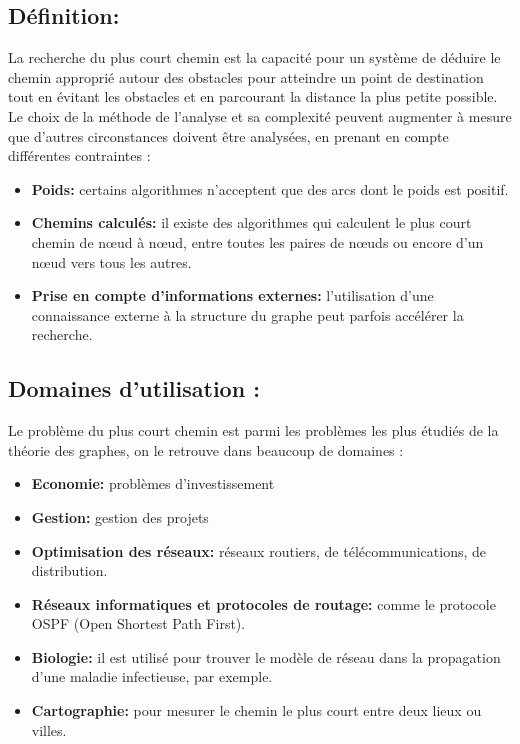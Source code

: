 \subsection{Définition:}
La recherche du plus court chemin est la capacité pour un système de déduire le chemin approprié autour des obstacles pour atteindre un point de destination tout en évitant les obstacles et en parcourant la distance la plus petite possible.
Le choix de la méthode de l'analyse et sa complexité peuvent augmenter à mesure que d'autres circonstances doivent être analysées, en prenant en compte différentes contraintes :

\begin{itemize}
	\item \textbf{Poids:} certains algorithmes n'acceptent que des arcs dont le poids est positif.
	\item \textbf{Chemins calculés:} il existe des algorithmes qui calculent le plus court chemin de nœud à nœud, entre toutes les paires de nœuds ou encore d'un nœud vers tous les autres.
	\item \textbf{Prise en compte d'informations externes:} l'utilisation d'une connaissance externe à la structure du graphe peut parfois accélérer la recherche.
\end{itemize}

\subsection{Domaines d'utilisation :}
Le problème du plus court chemin est parmi les problèmes les plus étudiés de la théorie des graphes, on le retrouve dans beaucoup de domaines :
\begin{itemize}
\item\textbf{Economie:} problèmes d’investissement
\item\textbf{Gestion:} gestion des projets
\item\textbf{Optimisation des réseaux:} réseaux routiers, de télécommunications, de distribution.
\item\textbf{Réseaux informatiques et protocoles de routage:}   comme le protocole OSPF (Open Shortest Path First).
\item\textbf{Biologie:} il est utilisé pour trouver le modèle de réseau dans la propagation d'une maladie infectieuse, par exemple.
\item\textbf{Cartographie:} pour mesurer le chemin le plus court entre deux lieux ou villes.
\end{itemize}

